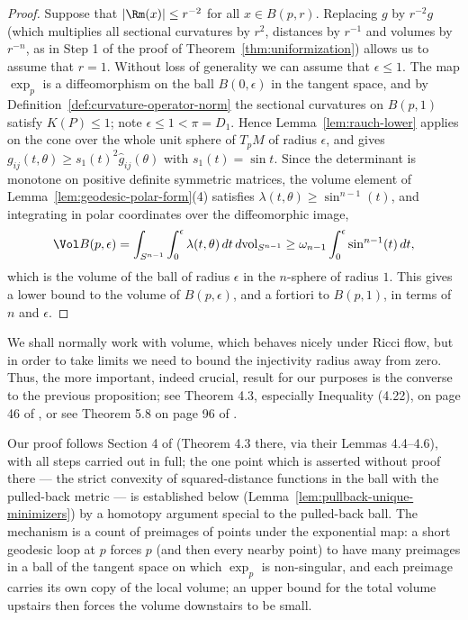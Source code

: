 \begin{proof}
Suppose that $|\Rm(x)|\le r^{-2}$ for all $x\in B(p,r)$.
Replacing $g$ by $r^{-2} g$ (which multiplies all sectional
curvatures by $r^{2}$, distances by $r^{-1}$ and volumes by
$r^{-n}$, as in Step 1 of the proof of
Theorem~\ref{thm:uniformization}) allows us to assume that $r=1$.
Without loss of generality we can assume that $\epsilon\le 1$. The
map $\exp_p$ is a diffeomorphism on the ball $B(0,\epsilon)$ in
the tangent space, and by
Definition~\ref{def:curvature-operator-norm} the sectional
curvatures on $B(p,1)$ satisfy $K(P)\le 1$; note
$\epsilon\le1<\pi=D_1$. Hence Lemma~\ref{lem:rauch-lower} applies
on the cone over the whole unit sphere of $T_pM$ of radius
$\epsilon$, and gives $g_{ij}(t,\theta)\ge s_1(t)^2\hat
g_{ij}(\theta)$ with $s_1(t)=\sin t$. Since the determinant is
monotone on positive definite symmetric matrices, the volume
element of Lemma~\ref{lem:geodesic-polar-form}(4) satisfies
$\lambda(t,\theta)\ge\sin^{n-1}(t)$, and integrating in polar
coordinates over the diffeomorphic image,
$$\Vol B(p,\epsilon)=\int_{S^{n-1}}\int_0^\epsilon
\lambda(t,\theta)\,dt\,d\mathrm{vol}_{S^{n-1}}
\ge\omega_{n-1}\int_0^\epsilon\sin^{n-1}(t)\,dt,$$
which is the volume of the ball of radius $\epsilon$ in
the $n$-sphere of radius $1$. This gives a lower bound to the volume
of $B(p,\epsilon)$, and a fortiori to $B(p,1)$, in terms of $n$ and
$\epsilon$.
\end{proof}

 We shall normally work with volume, which behaves nicely under Ricci
flow, but in order to take limits we need to bound the injectivity
radius away from zero. Thus, the more important, indeed crucial,
result for our purposes is the converse to the previous proposition;
see Theorem 4.3, especially Inequality (4.22), on page 46 of
\cite{CheegerGromovTaylor}, or see Theorem 5.8 on page 96 of
\cite{CheegerEbin}.

Our proof follows Section 4 of \cite{CheegerGromovTaylor}
(Theorem 4.3 there, via their Lemmas 4.4--4.6), with all steps
carried out in full; the one point which is asserted without proof
there --- the strict convexity of squared-distance functions in the
ball with the pulled-back metric --- is established below
(Lemma~\ref{lem:pullback-unique-minimizers}) by a homotopy argument
special to the pulled-back ball. The mechanism is a count of
preimages of points under the exponential map: a short geodesic
loop at $p$ forces $p$ (and then every nearby point) to have many
preimages in a ball of the tangent space on which
$\exp_p$ is non-singular, and each preimage carries its own copy
of the local volume; an upper bound for the total volume upstairs
then forces the volume downstairs to be small.

